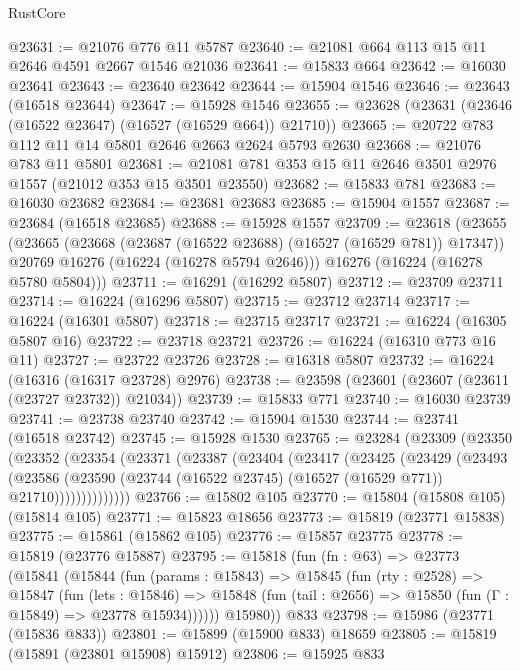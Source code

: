 \begin{lexlean}{RustCore}
\begin{coremodule}
@23631 := @21076 @776 @11 @5787
@23640 := @21081 @664 @113 @15 @11 @2646 @4591 @2667 @1546 @21036
@23641 := @15833 @664
@23642 := @16030 @23641
@23643 := @23640 @23642
@23644 := @15904 @1546
@23646 := @23643 (@16518 @23644)
@23647 := @15928 @1546
@23655 := @23628 (@23631 (@23646 (@16522 @23647) (@16527 (@16529 @664)) @21710))
@23665 := @20722 @783 @112 @11 @14 @5801 @2646 @2663 @2624 @5793 @2630
@23668 := @21076 @783 @11 @5801
@23681 := @21081 @781 @353 @15 @11 @2646 @3501 @2976 @1557 (@21012 @353 @15 @3501 @23550)
@23682 := @15833 @781
@23683 := @16030 @23682
@23684 := @23681 @23683
@23685 := @15904 @1557
@23687 := @23684 (@16518 @23685)
@23688 := @15928 @1557
@23709 := @23618
    (@23655
      (@23665
        (@23668 (@23687 (@16522 @23688) (@16527 (@16529 @781)) @17347))
        @20769
        @16276
        (@16224 (@16278 @5794 @2646)))
      @16276
      (@16224 (@16278 @5780 @5804)))
@23711 := @16291 (@16292 @5807)
@23712 := @23709 @23711
@23714 := @16224 (@16296 @5807)
@23715 := @23712 @23714
@23717 := @16224 (@16301 @5807)
@23718 := @23715 @23717
@23721 := @16224 (@16305 @5807 @16)
@23722 := @23718 @23721
@23726 := @16224 (@16310 @773 @16 @11)
@23727 := @23722 @23726
@23728 := @16318 @5807
@23732 := @16224 (@16316 (@16317 @23728) @2976)
@23738 := @23598 (@23601 (@23607 (@23611 (@23727 @23732)) @21034))
@23739 := @15833 @771
@23740 := @16030 @23739
@23741 := @23738 @23740
@23742 := @15904 @1530
@23744 := @23741 (@16518 @23742)
@23745 := @15928 @1530
@23765 := @23284
    (@23309
      (@23350
        (@23352
          (@23354
            (@23371
              (@23387
                (@23404
                  (@23417
                    (@23425
                      (@23429
                        (@23493
                          (@23586
                            (@23590
                              (@23744 (@16522 @23745) (@16527 (@16529 @771)) @21710))))))))))))))
@23766 := @15802 @105
@23770 := @15804 (@15808 @105) (@15814 @105)
@23771 := @15823 @18656
@23773 := @15819 (@23771 @15838)
@23775 := @15861 (@15862 @105)
@23776 := @15857 @23775
@23778 := @15819 (@23776 @15887)
@23795 := @15818
    (fun (fn : @63) =>
    @23773
      (@15841
        (@15844
          (fun (params : @15843) =>
          @15845
            (fun (rty : @2528) =>
            @15847
              (fun (lets : @15846) =>
              @15848 (fun (tail : @2656) => @15850 (fun (Γ : @15849) => @23778 @15934))))))
        @15980))
    @833
@23798 := @15986 (@23771 (@15836 @833))
@23801 := @15899 (@15900 @833) @18659
@23805 := @15819 (@15891 (@23801 @15908) @15912)
@23806 := @15925 @833

\end{coremodule}
\end{lexlean}
